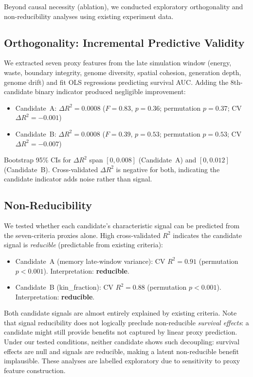 \documentclass[letterpaper]{article}
\begin{document}
Beyond causal necessity (ablation), we conducted exploratory
orthogonality and non-reducibility analyses using existing experiment
data.

\subsection{Orthogonality: Incremental Predictive Validity}

We extracted seven proxy features from the late simulation window
(energy, waste, boundary integrity, genome diversity, spatial cohesion,
generation depth, genome drift) and fit OLS regressions predicting
survival AUC.  Adding the 8th-candidate binary indicator produced
negligible improvement:

\begin{itemize}
\item Candidate~A: $\Delta R^2 = 0.0008$ ($F = 0.83$, $p = 0.36$;
  permutation $p = 0.37$; CV $\Delta R^2 = -0.001$)
\item Candidate~B: $\Delta R^2 = 0.0008$ ($F = 0.39$, $p = 0.53$;
  permutation $p = 0.53$; CV $\Delta R^2 = -0.007$)
\end{itemize}

Bootstrap 95\% CIs for $\Delta R^2$ span $[0, 0.008]$ (Candidate~A)
and $[0, 0.012]$ (Candidate~B).  Cross-validated $\Delta R^2$ is
negative for both, indicating the candidate indicator adds noise
rather than signal.

\subsection{Non-Reducibility}

We tested whether each candidate's characteristic signal can be
predicted from the seven-criteria proxies alone.  High cross-validated
$R^2$ indicates the candidate signal is \emph{reducible} (predictable
from existing criteria):

\begin{itemize}
\item Candidate~A (memory late-window variance): CV $R^2 = 0.91$
  (permutation $p < 0.001$).  Interpretation: \textbf{reducible}.
\item Candidate~B (kin\_fraction): CV $R^2 = 0.88$ (permutation
  $p < 0.001$).  Interpretation: \textbf{reducible}.
\end{itemize}

Both candidate signals are almost entirely explained by existing
criteria.  Note that signal reducibility does not logically preclude
non-reducible \emph{survival effects}: a candidate might still provide
benefits not captured by linear proxy prediction.  Under our tested
conditions, neither candidate shows such decoupling: survival effects are
null and signals are reducible, making a latent non-reducible benefit
implausible.  These analyses are labelled exploratory due to sensitivity
to proxy feature construction.
\end{document}
